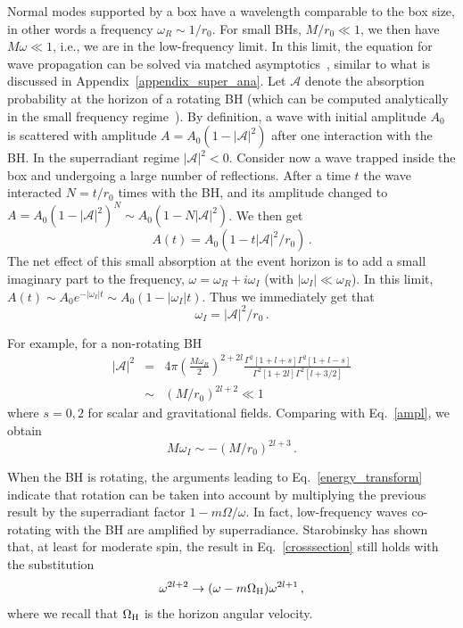 \documentclass[11pt]{article}
\newcommand{\be}{\begin{equation}}
\newcommand{\ee}{\end{equation}}
\def\beq{\begin{eqnarray}}
\def\eeq{\end{eqnarray}}
\numberwithin{equation}{section} %
\begin{document}
Normal modes supported by a box have a wavelength comparable to the box size, in other words a frequency $\omega_R\sim1/r_0$. For small BHs, $M/r_0\ll 1$, we then have $M\omega\ll 1$, i.e., we are in the 
low-frequency limit. In this limit, the equation for wave propagation can be solved via matched asymptotics~\cite{Cardoso:2005mh}, similar to what is discussed in Appendix~\ref{appendix_super_ana}. 
Let $\mathcal{A}$ denote the absorption probability at the horizon of a rotating BH (which can be computed analytically in the small frequency regime~\cite{Cardoso:2005mh,1973ZhETF..64...48S,Staro1,1973ZhETF..65....3S,Staro2}).
By definition, a wave with initial amplitude $A_0$ is scattered with amplitude $A=A_0\left(1-|\mathcal{A}|^2\right)$ after one interaction with the BH.
In the superradiant regime $|\mathcal{A}|^2<0$.
Consider now a wave trapped inside the box and undergoing a large number of reflections. After a time $t$ the wave interacted $N=t/r_0$ times with the BH, and its amplitude changed to
$A=A_0\left(1-|\mathcal{A}|^2\right)^N\sim A_0\left(1-N|\mathcal{A}|^2\right)$. We then get
%
\be
A(t)=A_0\left(1-t|\mathcal{A}|^2/r_0\right)\,. \label{ampl0}
\ee
%
The net effect of this small absorption at the event horizon is to add a small imaginary part to the frequency, $\omega=\omega_R+i\omega_I$ (with $|\omega_I|\ll\omega_R$). 
In this limit, $A(t)\sim A_0 e^{-|\omega_I| t}\sim A_0(1-|\omega_I| t)$. Thus we immediately get that
%
\be
\omega_I=|\mathcal{A}|^2/r_0\,. \label{ampl}
\ee
%


For example, for a non-rotating BH~\cite{Cardoso:2005mh}
%
\beq
\left|\mathcal{A}\right|^2&=& 4\pi \left(\frac{M\omega_R}{2}\right)^{2+2l} \frac{\Gamma^2[1+l+s]\Gamma^2[1+l-s]}{\Gamma^2[1+2l]\Gamma^2[l+3/2]}\label{crosssection}\\
%
&\sim&\left({M}/{r_0}\right)^{2l+2}\ll1\,
\eeq
%
where $s=0,2$ for scalar and gravitational fields. Comparing with Eq.~\eqref{ampl}, we obtain
%
\be\label{absor_wIm}
M\omega_I\sim-(M/r_0)^{2l+3}\,. 
\ee


When the BH is rotating, the arguments leading to Eq.~\eqref{energy_transform} indicate that rotation can be taken into account by multiplying the previous result
by the superradiant factor $1-m\Omega/\omega$. In fact, low-frequency waves co-rotating with the BH are amplified by superradiance. Starobinsky has shown that, at least for moderate spin, the result in Eq.~\eqref{crosssection} still holds with the substitution~\cite{1973ZhETF..64...48S,Staro1,1973ZhETF..65....3S,Staro2}
%
\be
\omega^{2l+2}\to (\omega-m\Omega_{\rm H})\omega^{2l+1}\,,\label{absor_wIm_rot}
\ee
%
where we recall that $\Omega_{\rm H}$ is the horizon angular velocity. 
\end{document}
